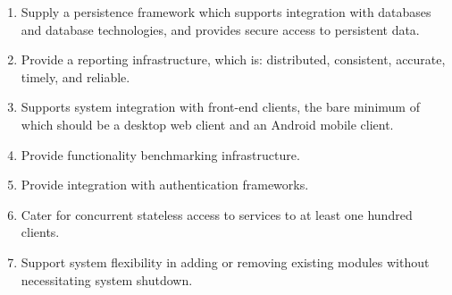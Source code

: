 \begin{enumerate}
		\item Supply a persistence framework which supports integration with databases and database technologies, and provides secure access to persistent data.
		\item Provide a reporting infrastructure, which is: distributed, consistent, accurate, timely, and reliable.
		\item Supports system integration with front-end clients, the bare minimum of which should be a desktop web client and an Android mobile client.
		\item Provide functionality benchmarking infrastructure.
		\item Provide integration with authentication frameworks.
		\item Cater for concurrent stateless access to services to at least one hundred clients.
		\item Support system flexibility in adding or removing existing modules without necessitating system shutdown.
\end{enumerate}